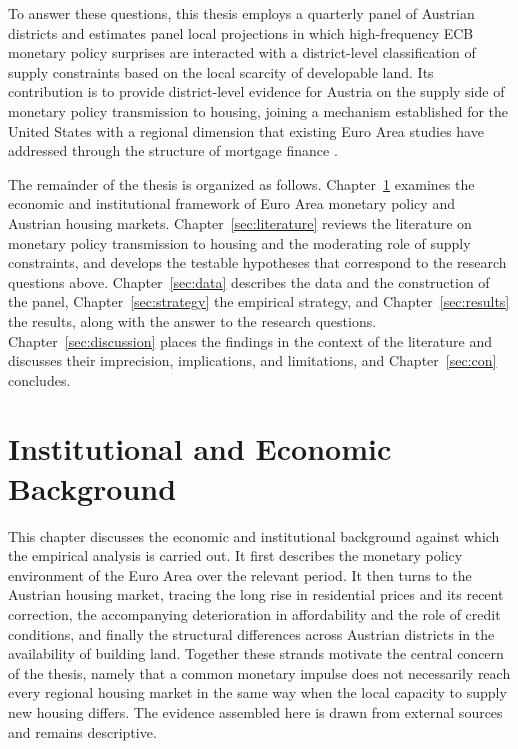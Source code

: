 \documentclass[a4paper,12pt, headsepline]{scrartcl}
\numberwithin{equation}{section}
\begin{document}
To answer these questions, this thesis employs a quarterly panel of Austrian districts and estimates panel local projections \citep{jorda2005} in which high-frequency ECB monetary policy surprises \citep{altavilla2019} are interacted with a district-level classification of supply constraints based on the local scarcity of developable land. Its contribution is to provide district-level evidence for Austria on the supply side of monetary policy transmission to housing, joining a mechanism established for the United States \citep{aastveit2022} with a regional dimension that existing Euro Area studies have addressed through the structure of mortgage finance \citep{battistini2025}.

The remainder of the thesis is organized as follows. Chapter~\ref{sec:background} examines the economic and institutional framework of Euro Area monetary policy and Austrian housing markets. Chapter~\ref{sec:literature} reviews the literature on monetary policy transmission to housing and the moderating role of supply constraints, and develops the testable hypotheses that correspond to the research questions above. Chapter~\ref{sec:data} describes the data and the construction of the panel, Chapter~\ref{sec:strategy} the empirical strategy, and Chapter~\ref{sec:results} the results, along with the answer to the research questions. Chapter~\ref{sec:discussion} places the findings in the context of the literature and discusses their imprecision, implications, and limitations, and Chapter~\ref{sec:con} concludes.

\section{Institutional and Economic Background}\label{sec:background}

This chapter discusses the economic and institutional background against which the empirical analysis is carried out. It first describes the monetary policy environment of the Euro Area over the relevant period. It then turns to the Austrian housing market, tracing the long rise in residential prices and its recent correction, the accompanying deterioration in affordability and the role of credit conditions, and finally the structural differences across Austrian districts in the availability of building land. Together these strands motivate the central concern of the thesis, namely that a common monetary impulse does not necessarily reach every regional housing market in the same way when the local capacity to supply new housing differs. The evidence assembled here is drawn from external sources and remains descriptive.
\end{document}
